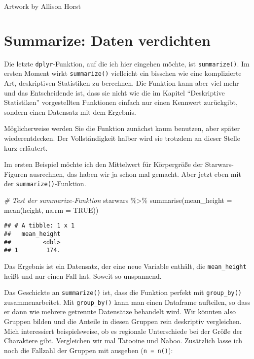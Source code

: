 \documentclass[
]{book}
\newenvironment{Shaded}{\begin{snugshade}}{\end{snugshade}}
\newcommand{\AttributeTok}[1]{\textcolor[rgb]{0.77,0.63,0.00}{#1}}
\newcommand{\CommentTok}[1]{\textcolor[rgb]{0.56,0.35,0.01}{\textit{#1}}}
\newcommand{\ConstantTok}[1]{\textcolor[rgb]{0.00,0.00,0.00}{#1}}
\newcommand{\FunctionTok}[1]{\textcolor[rgb]{0.00,0.00,0.00}{#1}}
\newcommand{\NormalTok}[1]{#1}
\newcommand{\SpecialCharTok}[1]{\textcolor[rgb]{0.00,0.00,0.00}{#1}}
\begin{document}
Artwork by Allison Horst

\hypertarget{summarize-daten-verdichten}{%
\section{Summarize: Daten verdichten}\label{summarize-daten-verdichten}}

Die letzte \texttt{dplyr}-Funktion, auf die ich hier eingehen möchte, ist \texttt{summarize()}. Im ersten Moment wirkt \texttt{summarize()} vielleicht ein bisschen wie eine komplizierte Art, deskriptiven Statistiken zu berechnen. Die Funktion kann aber viel mehr und das Entscheidende ist, dass sie nicht wie die im Kapitel ``Deskriptive Statistiken'' vorgestellten Funktionen einfach nur einen Kennwert zurückgibt, sondern einen Datensatz mit dem Ergebnis.

Möglicherweise werden Sie die Funktion zunächst kaum benutzen, aber später wiederentdecken. Der Vollständigkeit halber wird sie trotzdem an dieser Stelle kurz erläutert.

Im ersten Beispiel möchte ich den Mittelwert für Körpergröße der Starwars-Figuren ausrechnen, das haben wir ja schon mal gemacht. Aber jetzt eben mit der \texttt{summarize()}-Funktion.

\begin{Shaded}
\begin{Highlighting}[]
\CommentTok{\# Test der summarize{-}Funktion}
\NormalTok{starwars }\SpecialCharTok{\%\textgreater{}\%} 
  \FunctionTok{summarise}\NormalTok{(}\AttributeTok{mean\_height =} \FunctionTok{mean}\NormalTok{(height, }\AttributeTok{na.rm =} \ConstantTok{TRUE}\NormalTok{))}
\end{Highlighting}
\end{Shaded}

\begin{verbatim}
## # A tibble: 1 x 1
##   mean_height
##         <dbl>
## 1        174.
\end{verbatim}

Das Ergebnis ist ein Datensatz, der eine neue Variable enthält, die \texttt{mean\_height} heißt und nur einen Fall hat. Soweit so unspannend.

Das Geschickte an \texttt{summarize()} ist, dass die Funktion perfekt mit \texttt{group\_by()} zusammenarbeitet. Mit \texttt{group\_by()} kann man einen Dataframe aufteilen, so dass er dann wie mehrere getrennte Datensätze behandelt wird. Wir könnten also Gruppen bilden und die Anteile in diesen Gruppen rein deskriptiv vergleichen. Mich interessiert beispielsweise, ob es regionale Unterschiede bei der Größe der Charaktere gibt. Vergleichen wir mal Tatooine und Naboo. Zusätzlich lasse ich noch die Fallzahl der Gruppen mit ausgeben (\texttt{n\ =\ n()}):
\end{document}
